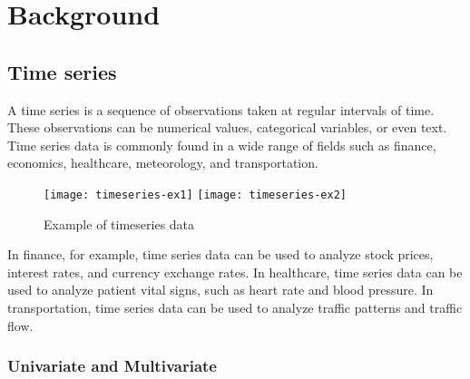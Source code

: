 \section{Background}

\subsection{Time series}
A time series is a sequence of observations taken at regular intervals of time.
These observations can be numerical values, categorical variables, or even text.
Time series data is commonly found in a wide range of fields such as finance, economics, healthcare, meteorology, and transportation.

\begin{figure}[h]
  \centering
  \texttt{[image: timeseries-ex1]}
  \texttt{[image: timeseries-ex2]}
  \caption{Example of timeseries data}
\end{figure}

In finance, for example, time series data can be used to analyze stock prices, interest rates, and currency exchange rates.
In healthcare, time series data can be used to analyze patient vital signs, such as heart rate and blood pressure.
In transportation, time series data can be used to analyze traffic patterns and traffic flow.


\subsubsection[short]{Univariate and Multivariate}

